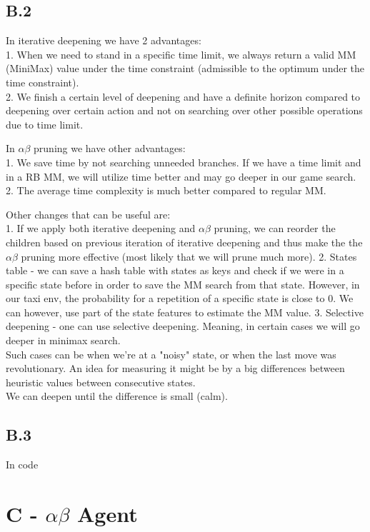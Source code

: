 \documentclass[12pt]{article}
\begin{document}
\subsection*{B.2}
In iterative deepening we have 2 advantages:\\
1. When we need to stand in a specific time limit, we always return a valid MM (MiniMax) value under the time constraint (admissible to the optimum under the time constraint).\\
2. We finish a certain level of deepening and have a definite horizon compared to deepening over certain action and not on searching over other possible operations due to time limit. 

In $\alpha\beta$ pruning we have other advantages:\\
1. We save time by not searching unneeded branches. If we have a time limit and in a RB MM, we will utilize time better and may go deeper in our game search.
2. The average time complexity is much better compared to regular MM.

Other changes that can be useful are:\\
1. If we apply both iterative deepening and $\alpha\beta$ pruning, we can reorder the children based on previous iteration of iterative deepening and thus make the the $\alpha\beta$ pruning more effective (most likely that we will prune much more).
2. States table - we can save a hash table with states as keys and check if we were in a specific state before in order to save the MM search from that state. However, in our taxi env, the probability for a repetition of a specific state is close to 0. We can however, use part of the state features to estimate the MM value.
3. Selective deepening - one can use selective deepening. Meaning, in certain cases we will go deeper in minimax search.\\
Such cases can be when we're at a "noisy" state, or when the last move was revolutionary. An idea for measuring it might be by a big differences between heuristic values between consecutive states.\\
We can deepen until the difference is small (calm).

\subsection*{B.3}
In code 

\section*{C - $\alpha\beta$ Agent}
\end{document}
